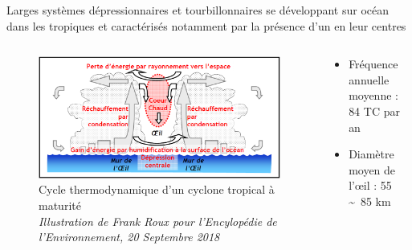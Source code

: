 \documentclass[aspectratio=169, usepdftitle=false, xcolor={dvipsnames}, 9pt,table]{beamer}
\begin{document}
\begin{frame}[t]
    \begin{center}
        \begin{minipage}{0.7\linewidth}
            \begin{definition}
                \footnotesize
                \centering
                Larges systèmes dépressionnaires et tourbillonnaires se développant sur océan dans les tropiques et caractérisés notamment par la présence d'un
             en leur centres
            \end{definition}
        \end{minipage}
    \end{center}
    \begin{columns}
        \begin{column}{0.5\textwidth}
            \begin{figure}[h]
                \centering
                \includegraphics[width=\textwidth]{Figures/cyclones1_fig3_Cycle-thermodynamique-cyclone.png}
                \caption{Cycle thermodynamique d'un cyclone tropical à maturité\\
                \textit{Illustration de Frank Roux pour l'Encylopédie de l'Environnement, 20 Septembre 2018}}
            \end{figure}
        \end{column}
        \begin{column}{0.5\textwidth}
           \setlength{\leftmargini}{2.5ex}
           \vspace{-2em}
           \begin{block} 
                \footnotesize
                \begin{itemize}
                    \item Fréquence annuelle moyenne : 84 TC par an \mbox{\parencite{schreck_impact_2014}}
                    \item Diamètre moyen de l'œil : 55 \sim~85 km \mbox{\parencite{weatherford_typhoon_1985}}

\end{itemize}
\end{block}
\end{column}
\end{columns}
\end{frame}
\end{document}
